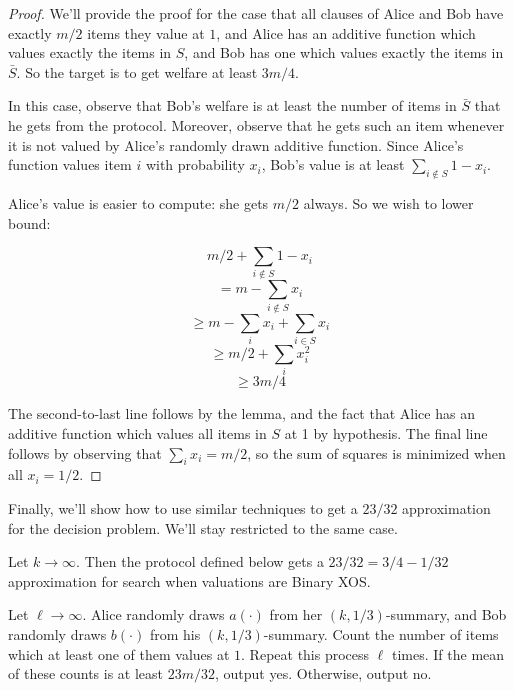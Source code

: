 \begin{proof}
We'll provide the proof for the case that all clauses of Alice and Bob have exactly $m/2$ items they value at $1$, and Alice has an additive function which values exactly the items in $S$, and Bob has one which values exactly the items in $\bar{S}$. So the target is to get welfare at least $3m/4$. 

In this case, observe that Bob's welfare is at least the number of items in $\bar{S}$ that he gets from the protocol. Moreover, observe that he gets such an item whenever it is not valued by Alice's randomly drawn additive function. Since Alice's function values item $i$ with probability $x_i$, Bob's value is at least $\sum_{i \notin S} 1-x_i$. 

Alice's value is easier to compute: she gets $m/2$ always. So we wish to lower bound:

$$m/2 + \sum_{i \notin S} 1-x_i$$
$$= m - \sum_{i \notin S} x_i$$
$$\geq m - \sum_i x_i + \sum_{ i \in S} x_i$$
$$\geq m/2 + \sum_i x^2_i$$
$$ \geq 3m/4$$

The second-to-last line follows by the lemma, and the fact that Alice has an additive function which values all items in $S$ at 1 by hypothesis. The final line follows by observing that $\sum_i x_i = m/2$, so the sum of squares is minimized when all $x_i = 1/2$. 
\end{proof}

Finally, we'll show how to use similar techniques to get a $23/32$ approximation for the decision problem. We'll stay restricted to the same case.

\begin{theorem} Let $k \rightarrow \infty$. Then the protocol defined below gets a $23/32 = 3/4 - 1/32$ approximation for search when valuations are Binary XOS.

\end{theorem}

Let $\ell\rightarrow \infty$. Alice randomly draws $a(\cdot)$ from her $(k, 1/3)$-summary, and Bob randomly draws $b(\cdot)$ from his $(k, 1/3)$-summary. Count the number of items which at least one of them values at $1$. Repeat this process $\ell$ times. If the mean of these counts is at least $23m/32$, output yes. Otherwise, output no. \\

